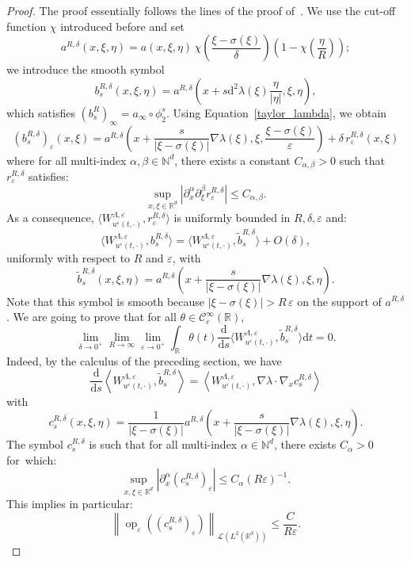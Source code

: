 \documentclass[10pt]{amsart}
\theoremstyle{definition}
\DeclareMathOperator{\op}{op}
\newcommand*\R{{\mathbb R}}
\newcommand*\N{{\mathbb N}}
\newcommand*\eps{\varepsilon}
\numberwithin{equation}{section}
\newcommand*{\dd}{\mathrm{d}}
\newcommand*{\dt}{\dd t}
\newcommand*{\ds}{\dd s}
\begin{document}
\begin{proof}
The proof essentially follows the lines of the proof of~\cite[Theorem~2.5]{AFM:15}. We use the cut-off function $\chi$ introduced before and set
\[
a^{R,\delta}(x,\xi,\eta)= a(x,\xi,\eta)\,\chi\left(\frac{\xi-\sigma(\xi)}{\delta}\right)\left(1-\chi\left(\frac{\eta}{R}\right)\right);
\]
we introduce the smooth symbol
\[
b^{R,\delta}_s(x,\xi,\eta)= a^{R,\delta}\left(x+s \dd^2\lambda(\xi) \frac{\eta}{|\eta|},\xi,\eta\right),
\]
which satisfies $(b_s^{R})_\infty = a_\infty\circ\phi^s_2.$ Using Equation~\eqref{taylor_lambda}, we obtain
\[
\left(b^{R,\delta} _s\right)_\eps (x,\xi) =a^{R,\delta}\left(x+\frac{s}{|\xi-\sigma(\xi)|} \nabla\lambda(\xi),\xi,\frac{\xi-\sigma(\xi)}{\eps}\right) +\delta \, r_\eps^{R,\delta}(x,\xi)
\]
where for all multi-index $\alpha,\beta \in \N^d$, there exists a constant $C_{\alpha,\beta}>0$ such that $r_\eps^{R,\delta}$ satisfies:
\[
\sup_{x,\xi\in\R^d}\left|\partial_x^\alpha\partial_\xi^\beta r^{R,\delta}_\eps\right| \leq C_{\alpha,\beta}.
\]
As a consequence, $\langle W_{u^\eps(t,\cdot)}^{\Lambda,\eps}, r_\eps ^{R,\delta}\rangle $ is uniformly bounded in $R,\delta,\eps$ and:
\[
\langle W_{u^\eps(t,\cdot)}^{\Lambda,\eps}, b^{R,\delta}_s \rangle = \langle W_{u^\eps(t,\cdot)}^{\Lambda,\eps}, \widetilde b^{R,\delta}_s\rangle +O(\delta),
\]
uniformly with respect to $R$ and $\eps$, with
\[
\widetilde b^{R,\delta}_s(x,\xi,\eta)=a^{R,\delta}\left(x+\frac{s}{|\xi-\sigma(\xi)|} \nabla\lambda(\xi),\xi,\eta\right).
\]
Note that this symbol is smooth because $|\xi-\sigma(\xi)|>R\,\eps $ on the support of $a^{R,\delta}$. We are going to prove that for all $\theta\in{\mathcal C}_c^\infty(\R)$,
\[
\lim_{\delta\to 0^+}\lim_{R\to\infty} \lim_{\eps\to 0^+}\int_\R\theta(t) \frac{\dd}{\ds} \langle W_{u^\eps(t,\cdot)}^{\Lambda,\eps}, \widetilde b^{R,\delta}_s\rangle \dt =0.
\]
Indeed, by the calculus of the preceding section, we have
\[
\frac{\dd}{\ds} \left\langle W_{u^\eps(t,\cdot)}^{\Lambda,\eps}, \widetilde b^{R,\delta}_s\right\rangle= \left\langle W_{u^\eps(t,\cdot)}^{\Lambda,\eps}, \nabla\lambda\cdot \nabla_x c^{R,\delta}_s\right\rangle
\]
with
\[
c^{R,\delta}_s (x,\xi,\eta) =\frac{1}{|\xi-\sigma(\xi)| }a^{R,\delta}\left(x+\frac{s}{|\xi-\sigma(\xi)|} \nabla\lambda(\xi),\xi,\eta\right).
\]
The symbol $c^{R,\delta}_s$ is such that for all multi-index $\alpha \in \N^d$, there exists $C_{\alpha}>0$ for~which:
\[
\sup_{x,\xi\in\R^d}\left|\partial_x^\alpha (c_s^{R,\delta})_\eps\right| \leq C_{\alpha} (R\eps)^{-1}.
\]
This implies in particular:
\[
\left\| \op_\eps((c^{R,\delta}_s)_\eps)\right\|_{{\mathcal L}(L^2(\R^d))}\leq \frac{C}{R\eps}.
\]
\end{proof}
\end{document}
